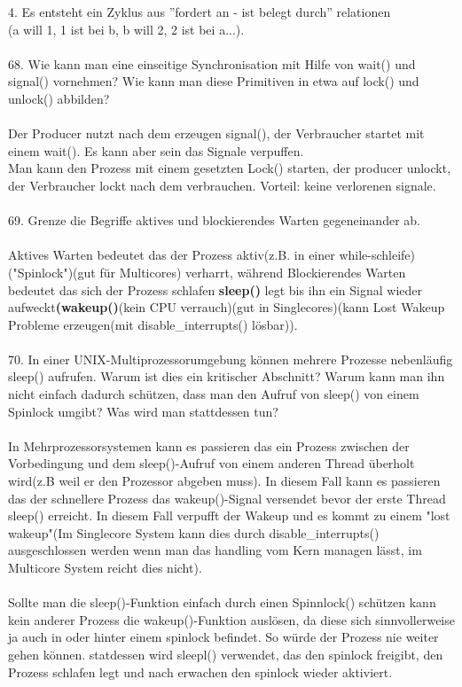 \documentclass{article}
\begin{document}
4. Es entsteht ein Zyklus aus ''fordert an - ist belegt durch'' relationen\\(a will 1, 1 ist bei b, b will 2, 2 ist bei a...).
\\
\\
68. Wie kann man eine einseitige Synchronisation mit Hilfe von wait() und signal() vornehmen? Wie kann man diese Primitiven in etwa auf lock() und unlock() abbilden?
\\
\\
Der Producer nutzt nach dem erzeugen signal(), der Verbraucher startet mit einem wait(). Es kann aber sein das Signale verpuffen.\\
Man kann den Prozess mit einem gesetzten Lock() starten, der producer unlockt, der Verbraucher lockt nach dem verbrauchen. Vorteil: keine verlorenen signale.
\\
\\
69. Grenze die Begriffe aktives und blockierendes Warten gegeneinander ab.
\\
\\
Aktives Warten bedeutet das der Prozess aktiv(z.B. in einer while-schleife)("Spinlock")(gut f\"ur Multicores) verharrt, w\"ahrend Blockierendes Warten bedeutet das sich der Prozess schlafen \textbf{sleep()} legt bis ihn ein Signal wieder aufweckt\textbf{(wakeup()}(kein CPU verrauch)(gut in Singlecores)(kann Lost Wakeup Probleme erzeugen(mit disable\_interrupts() l\"osbar)). 
\\
\\
70. In einer UNIX-Multiprozessorumgebung können mehrere Prozesse nebenläufig sleep() aufrufen. Warum ist dies ein kritischer Abschnitt? Warum kann man ihn nicht einfach dadurch schützen, dass man den Aufruf von sleep() von einem Spinlock umgibt? Was wird man stattdessen tun?
\\
\\
In Mehrprozessorsystemen kann es passieren das ein Prozess zwischen der Vorbedingung und dem sleep()-Aufruf von einem anderen Thread \"uberholt wird(z.B weil er den Prozessor abgeben muss). In diesem Fall kann es passieren das der schnellere Prozess das wakeup()-Signal versendet bevor der erste Thread sleep() erreicht. In diesem Fall verpufft der Wakeup und es kommt zu einem "lost wakeup"(Im Singlecore System kann dies durch disable\_interrupts() ausgeschlossen werden wenn man das handling vom Kern managen l\"asst, im Multicore System reicht dies nicht).
\\
\\
Sollte man die sleep()-Funktion einfach durch einen Spinnlock() sch\"utzen kann kein anderer Prozess die wakeup()-Funktion ausl\"osen, da diese sich sinnvollerweise ja auch in oder hinter einem spinlock befindet. So w\"urde der Prozess nie weiter gehen k\"onnen. statdessen wird sleepl() verwendet, das den spinlock freigibt, den Prozess schlafen legt und nach erwachen den spinlock wieder aktiviert.
\end{document}

